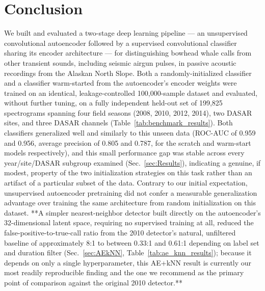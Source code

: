\documentclass[preprint,NumberedRefs]{JASAnew}
\begin{document}
\section{\label{sec:Conclusion}Conclusion}

We built and evaluated a two-stage deep learning pipeline — an unsupervised
convolutional autoencoder followed by a supervised convolutional classifier
sharing its encoder architecture — for distinguishing bowhead whale calls
from other transient sounds, including seismic airgun pulses, in passive
acoustic recordings from the Alaskan North Slope. Both a randomly-initialized
classifier and a classifier warm-started from the autoencoder's encoder
weights were trained on an identical, leakage-controlled 100,000-sample
dataset and evaluated, without further tuning, on a fully independent
held-out set of 199,825 spectrograms spanning four field seasons (2008,
2010, 2012, 2014), two DASAR sites, and three DASAR channels
(Table~\ref{tab:benchmark_results}). Both classifiers generalized well and
similarly to this unseen data (ROC-AUC of 0.959 and 0.956, average precision
of 0.805 and 0.787, for the scratch and warm-start models respectively), and
this small performance gap was stable across every year/site/DASAR subgroup
examined (Sec.~\ref{sec:Results}), indicating a genuine, if modest, property
of the two initialization strategies on this task rather than an artifact of
a particular subset of the data. Contrary to our initial expectation,
unsupervised autoencoder pretraining did not confer a measurable
generalization advantage over training the same architecture from random
initialization on this dataset. **A simpler nearest-neighbor detector built
directly on the autoencoder's 32-dimensional latent space, requiring no
supervised training at all, reduced the false-positive-to-true-call ratio
from the 2010 detector's natural, unfiltered baseline of approximately 8:1
to between 0.33:1 and 0.61:1 depending on label set and duration filter
(Sec.~\ref{sec:AEkNN}, Table~\ref{tab:ae_knn_results}); because it depends on
only a single hyperparameter, this AE+kNN result is currently our most
readily reproducible finding and the one we recommend as the primary point
of comparison against the original 2010 detector.**
\end{document}
